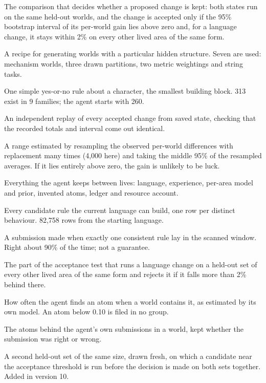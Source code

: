 \documentclass[11pt]{article}
\begin{document}
\begin{description}[leftmargin=*,style=nextline]
\item[Acceptance test (``prove'')] The comparison that decides whether a proposed change is kept: both states run on the same held-out worlds, and the change is accepted only if the 95\% bootstrap interval of its per-world gain lies above zero and, for a language change, it stays within 2\% on every other lived area of the same form.
\item[Area] A recipe for generating worlds with a particular hidden structure. Seven are used: mechanism worlds, three drawn partitions, two metric weightings and string tasks.
\item[Atom] One simple yes-or-no rule about a character, the smallest building block. 313 exist in 9 families; the agent starts with 260.
\item[Audit] An independent replay of every accepted change from saved state, checking that the recorded totals and interval come out identical.
\item[Bootstrap interval] A range estimated by resampling the observed per-world differences with replacement many times (4,000 here) and taking the middle 95\% of the resampled averages. If it lies entirely above zero, the gain is unlikely to be luck.
\item[Carried state] Everything the agent keeps between lives: language, experience, per-area model and prior, invented atoms, ledger and resource account.
\item[Catalog] Every candidate rule the current language can build, one row per distinct behaviour. 82,758 rows from the starting language.
\item[Confident pick] A submission made when exactly one consistent rule lay in the scanned window. Right about 90\% of the time; not a guarantee.
\item[Cross-area check] The part of the acceptance test that runs a language change on a held-out set of every other lived area of the same form and rejects it if it falls more than 2\% behind there.
\item[Discovery rate] How often the agent finds an atom when a world contains it, as estimated by its own model. An atom below 0.10 is filed in no group.
\item[Earned experience] The atoms behind the agent's own submissions in a world, kept whether the submission was right or wrong.
\item[Extension set] A second held-out set of the same size, drawn fresh, on which a candidate near the acceptance threshold is run before the decision is made on both sets together. Added in version 10.

\end{description}
\end{document}
